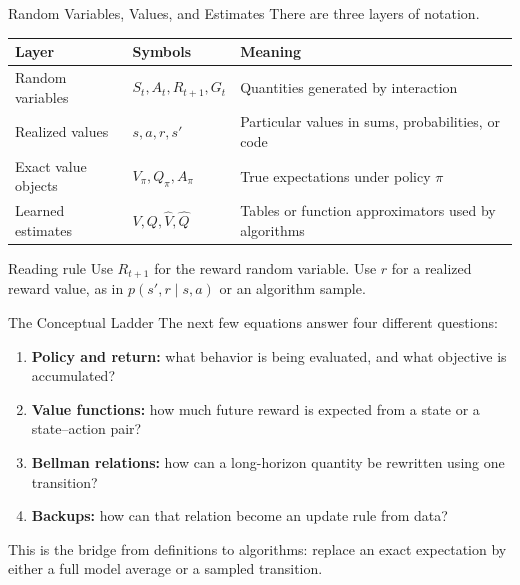 \documentclass[aspectratio=169]{beamer}
\begin{document}
\begin{frame}{Random Variables, Values, and Estimates}
\small
There are three layers of notation.

\vspace{0.5em}
\begin{center}
\begin{tabular}{>{\raggedright\arraybackslash}p{}
                >{\raggedright\arraybackslash}p{}
                >{\raggedright\arraybackslash}p{}}
\toprule
Layer & Symbols & Meaning \\
\midrule
Random variables & $S_t,A_t,R_{t+1},G_t$ & Quantities generated by interaction \\
Realized values & $s,a,r,s'$ & Particular values in sums, probabilities, or code \\
Exact value objects & $V_\pi,Q_\pi,A_\pi$ & True expectations under policy $\pi$ \\
Learned estimates & $V,Q,\hat V,\hat Q$ & Tables or function approximators used by algorithms \\
\bottomrule
\end{tabular}
\end{center}

\vspace{0.6em}
\begin{block}{Reading rule}
Use $R_{t+1}$ for the reward random variable.  Use $r$ for a realized reward value, as in $p(s',r\mid s,a)$ or an algorithm sample.
\end{block}
\end{frame}

\begin{frame}{The Conceptual Ladder}
\small
The next few equations answer four different questions:

\vspace{0.4em}
\begin{enumerate}
    \item \textbf{Policy and return:} what behavior is being evaluated, and what objective is accumulated?
    \item \textbf{Value functions:} how much future reward is expected from a state or a state--action pair?
    \item \textbf{Bellman relations:} how can a long-horizon quantity be rewritten using one transition?
    \item \textbf{Backups:} how can that relation become an update rule from data?
\end{enumerate}

\vspace{0.6em}
This is the bridge from definitions to algorithms: replace an exact expectation by either a full model average or a sampled transition.
\end{frame}
\end{document}
